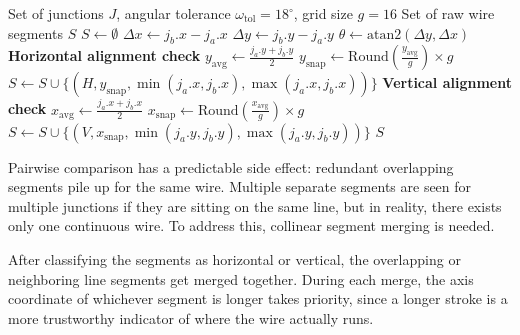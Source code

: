 \begin{algorithm}
\caption{Wire Classification and Alignment}
\label{algo:wire-classification-impl}
\begin{algorithmic}
\Require Set of junctions $J$, angular tolerance $\omega_{\text{tol}} = 18^\circ$, grid size $g = 16$
\Ensure Set of raw wire segments $S$
\State $S \leftarrow \emptyset$
    \State $\Delta x \leftarrow j_b.x - j_a.x$
    \State $\Delta y \leftarrow j_b.y - j_a.y$
    \State $\theta \leftarrow \text{atan2}(\Delta y, \Delta x)$
        \State \textbf{Horizontal alignment check}
        \State $y_{\text{avg}} \leftarrow \frac{j_a.y + j_b.y}{2}$
        \State $y_{\text{snap}} \leftarrow \text{Round}\left(\frac{y_{\text{avg}}}{g}\right) \times g$
        \State $S \leftarrow S \cup \{(H, y_{\text{snap}}, \min(j_a.x, j_b.x), \max(j_a.x, j_b.x))\}$
        \State \textbf{Vertical alignment check}
        \State $x_{\text{avg}} \leftarrow \frac{j_a.x + j_b.x}{2}$
        \State $x_{\text{snap}} \leftarrow \text{Round}\left(\frac{x_{\text{avg}}}{g}\right) \times g$
        \State $S \leftarrow S \cup \{(V, x_{\text{snap}}, \min(j_a.y, j_b.y), \max(j_a.y, j_b.y))\}$
    \EndIf
\EndFor
\State \Return $S$
\end{algorithmic}
\end{algorithm}

Pairwise comparison has a predictable side effect: redundant overlapping segments pile up for the same wire. Multiple separate segments are seen for multiple junctions if they are sitting on the same line, but in reality, there exists only one continuous wire. To address this, collinear segment merging is needed.

After classifying the segments as horizontal or vertical, the overlapping or neighboring line segments get merged together. During each merge, the axis coordinate of whichever segment is longer takes priority, since a longer stroke is a more trustworthy indicator of where the wire actually runs.

